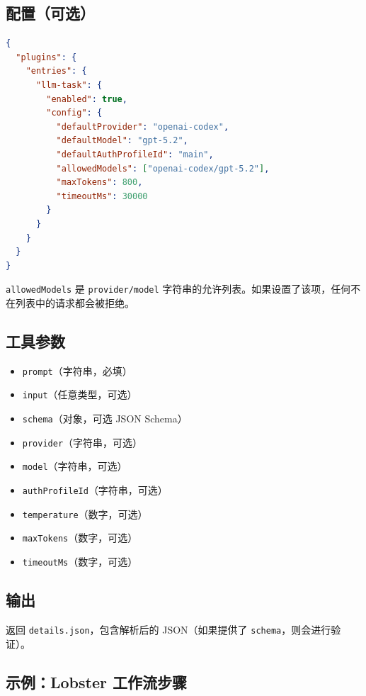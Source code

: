 \subsection{配置（可选）}


\begin{lstlisting}[language=json]
{
  "plugins": {
    "entries": {
      "llm-task": {
        "enabled": true,
        "config": {
          "defaultProvider": "openai-codex",
          "defaultModel": "gpt-5.2",
          "defaultAuthProfileId": "main",
          "allowedModels": ["openai-codex/gpt-5.2"],
          "maxTokens": 800,
          "timeoutMs": 30000
        }
      }
    }
  }
}
\end{lstlisting}


\texttt{allowedModels} 是 \texttt{provider/model} 字符串的允许列表。如果设置了该项，任何不在列表中的请求都会被拒绝。

\subsection{工具参数}


\begin{itemize}
  \item \texttt{prompt}（字符串，必填）
  \item \texttt{input}（任意类型，可选）
  \item \texttt{schema}（对象，可选 JSON Schema）
  \item \texttt{provider}（字符串，可选）
  \item \texttt{model}（字符串，可选）
  \item \texttt{authProfileId}（字符串，可选）
  \item \texttt{temperature}（数字，可选）
  \item \texttt{maxTokens}（数字，可选）
  \item \texttt{timeoutMs}（数字，可选）
\end{itemize}


\subsection{输出}


返回 \texttt{details.json}，包含解析后的 JSON（如果提供了 \texttt{schema}，则会进行验证）。

\subsection{示例：Lobster 工作流步骤}


